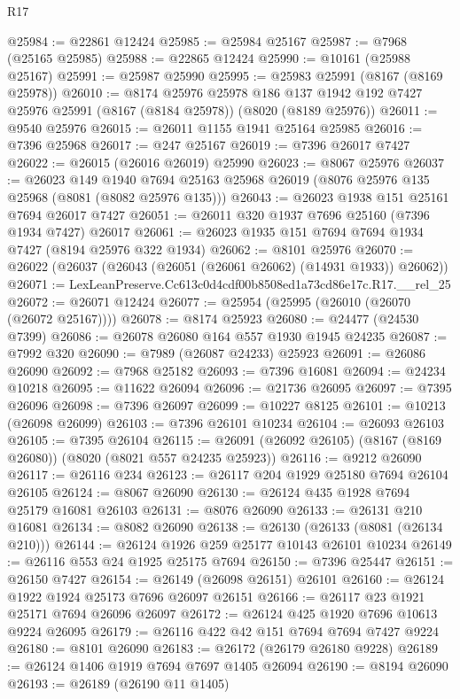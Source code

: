 \begin{lexlean}{R17}
\begin{coremodule}
@25984 := @22861 @12424
@25985 := @25984 @25167
@25987 := @7968 (@25165 @25985)
@25988 := @22865 @12424
@25990 := @10161 (@25988 @25167)
@25991 := @25987 @25990
@25995 := @25983 @25991 (@8167 (@8169 @25978))
@26010 := @8174
    @25976
    @25978
    @186
    @137
    @1942
    @192
    @7427
    @25976
    @25991
    (@8167 (@8184 @25978))
    (@8020 (@8189 @25976))
@26011 := @9540 @25976
@26015 := @26011 @1155 @1941 @25164 @25985
@26016 := @7396 @25968
@26017 := @247 @25167
@26019 := @7396 @26017 @7427
@26022 := @26015 (@26016 @26019) @25990
@26023 := @8067 @25976
@26037 := @26023
    @149
    @1940
    @7694
    @25163
    @25968
    @26019
    (@8076 @25976 @135 @25968 (@8081 (@8082 @25976 @135)))
@26043 := @26023 @1938 @151 @25161 @7694 @26017 @7427
@26051 := @26011 @320 @1937 @7696 @25160 (@7396 @1934 @7427) @26017
@26061 := @26023 @1935 @151 @7694 @7694 @1934 @7427 (@8194 @25976 @322 @1934)
@26062 := @8101 @25976
@26070 := @26022 (@26037 (@26043 (@26051 (@26061 @26062) (@14931 @1933)) @26062))
@26071 := LexLeanPreserve.Cc613c0d4cdf00b8508ed1a73cd86e17c.R17.__rel_25
@26072 := @26071 @12424
@26077 := @25954 (@25995 (@26010 (@26070 (@26072 @25167))))
@26078 := @8174 @25923
@26080 := @24477 (@24530 @7399)
@26086 := @26078 @26080 @164 @557 @1930 @1945 @24235
@26087 := @7992 @320
@26090 := @7989 (@26087 @24233) @25923
@26091 := @26086 @26090
@26092 := @7968 @25182
@26093 := @7396 @16081
@26094 := @24234 @10218
@26095 := @11622 @26094
@26096 := @21736 @26095
@26097 := @7395 @26096
@26098 := @7396 @26097
@26099 := @10227 @8125
@26101 := @10213 (@26098 @26099)
@26103 := @7396 @26101 @10234
@26104 := @26093 @26103
@26105 := @7395 @26104
@26115 := @26091 (@26092 @26105) (@8167 (@8169 @26080)) (@8020 (@8021 @557 @24235 @25923))
@26116 := @9212 @26090
@26117 := @26116 @234
@26123 := @26117 @204 @1929 @25180 @7694 @26104 @26105
@26124 := @8067 @26090
@26130 := @26124 @435 @1928 @7694 @25179 @16081 @26103
@26131 := @8076 @26090
@26133 := @26131 @210 @16081
@26134 := @8082 @26090
@26138 := @26130 (@26133 (@8081 (@26134 @210)))
@26144 := @26124 @1926 @259 @25177 @10143 @26101 @10234
@26149 := @26116 @553 @24 @1925 @25175 @7694
@26150 := @7396 @25447
@26151 := @26150 @7427
@26154 := @26149 (@26098 @26151) @26101
@26160 := @26124 @1922 @1924 @25173 @7696 @26097 @26151
@26166 := @26117 @23 @1921 @25171 @7694 @26096 @26097
@26172 := @26124 @425 @1920 @7696 @10613 @9224 @26095
@26179 := @26116 @422 @42 @151 @7694 @7694 @7427 @9224
@26180 := @8101 @26090
@26183 := @26172 (@26179 @26180 @9228)
@26189 := @26124 @1406 @1919 @7694 @7697 @1405 @26094
@26190 := @8194 @26090
@26193 := @26189 (@26190 @11 @1405)

\end{coremodule}
\end{lexlean}
